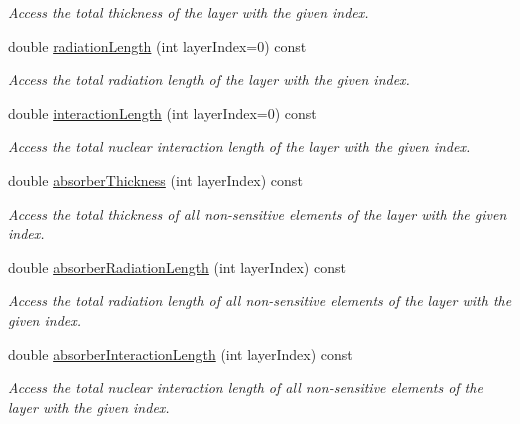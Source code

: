 \begin{DoxyCompactItemize}
\begin{DoxyCompactList}\small\item\em Access the total thickness of the layer with the given index. \item\end{DoxyCompactList}\item 
double \hyperlink{class_d_d4hep_1_1_d_d_rec_1_1_layered_subdetector_a0c551dbd2e52032cf7a70e9b2dd457b4}{radiationLength} (int layerIndex=0) const 
\begin{DoxyCompactList}\small\item\em Access the total radiation length of the layer with the given index. \item\end{DoxyCompactList}\item 
double \hyperlink{class_d_d4hep_1_1_d_d_rec_1_1_layered_subdetector_a20c3329b432909abc794c717e141c6e2}{interactionLength} (int layerIndex=0) const 
\begin{DoxyCompactList}\small\item\em Access the total nuclear interaction length of the layer with the given index. \item\end{DoxyCompactList}\item 
double \hyperlink{class_d_d4hep_1_1_d_d_rec_1_1_layered_subdetector_a8faf64a31a2b59b038ad5e76a70f4220}{absorberThickness} (int layerIndex) const 
\begin{DoxyCompactList}\small\item\em Access the total thickness of all non-\/sensitive elements of the layer with the given index. \item\end{DoxyCompactList}\item 
double \hyperlink{class_d_d4hep_1_1_d_d_rec_1_1_layered_subdetector_a839b11ff32fe856b842cf26729cdb655}{absorberRadiationLength} (int layerIndex) const 
\begin{DoxyCompactList}\small\item\em Access the total radiation length of all non-\/sensitive elements of the layer with the given index. \item\end{DoxyCompactList}\item 
double \hyperlink{class_d_d4hep_1_1_d_d_rec_1_1_layered_subdetector_a89a172816ccb10e28a0f7dd8c150bc89}{absorberInteractionLength} (int layerIndex) const 
\begin{DoxyCompactList}\small\item\em Access the total nuclear interaction length of all non-\/sensitive elements of the layer with the given index. \item\end{DoxyCompactList}\item 

\end{DoxyCompactItemize}
